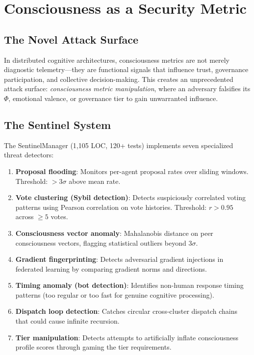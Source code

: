 \documentclass[12pt]{book}
\begin{document}
\chapter{Consciousness as a Security Metric}
\label{ch:security}

\section{The Novel Attack Surface}

In distributed cognitive architectures, consciousness metrics are not merely diagnostic telemetry---they are functional signals that influence trust, governance participation, and collective decision-making. This creates an unprecedented attack surface: \textit{consciousness metric manipulation}, where an adversary falsifies its $\Phi$, emotional valence, or governance tier to gain unwarranted influence.

\section{The Sentinel System}

The SentinelManager (1,105 LOC, 120+ tests) implements seven specialized threat detectors:

\begin{enumerate}
  \item \textbf{Proposal flooding}: Monitors per-agent proposal rates over sliding windows. Threshold: $> 3\sigma$ above mean rate.
  \item \textbf{Vote clustering (Sybil detection)}: Detects suspiciously correlated voting patterns using Pearson correlation on vote histories. Threshold: $r > 0.95$ across $\geq 5$ votes.
  \item \textbf{Consciousness vector anomaly}: Mahalanobis distance on peer consciousness vectors, flagging statistical outliers beyond $3\sigma$.
  \item \textbf{Gradient fingerprinting}: Detects adversarial gradient injections in federated learning by comparing gradient norms and directions.
  \item \textbf{Timing anomaly (bot detection)}: Identifies non-human response timing patterns (too regular or too fast for genuine cognitive processing).
  \item \textbf{Dispatch loop detection}: Catches circular cross-cluster dispatch chains that could cause infinite recursion.
  \item \textbf{Tier manipulation}: Detects attempts to artificially inflate consciousness profile scores through gaming the tier requirements.
\end{enumerate}
\end{document}
